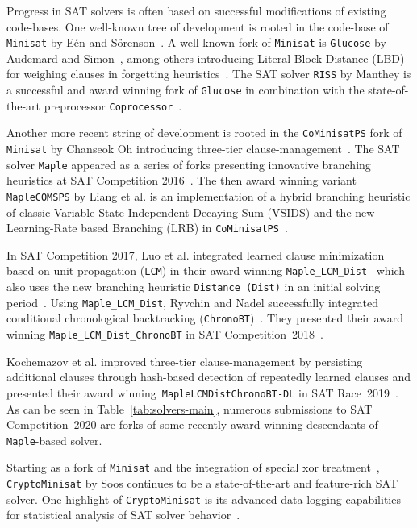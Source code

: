 \documentclass{elsarticle}
\newcommand{\solver}[1]{\texttt{#1}}
\begin{document}
Progress in SAT solvers is often based on successful modifications of existing code-bases. 
One well-known tree of development is rooted in the code-base of \solver{Minisat} by Eén and Sörenson~\cite{Niklas:2003:Minisat}. 
A well-known fork of \solver{Minisat} is \solver{Glucose} by Audemard and Simon~\cite{Audemard:2018:Glucose}, among others introducing Literal Block Distance (LBD) for weighing clauses in forgetting heuristics~\cite{Audemard:2009:Glucose}. 
The SAT solver \solver{RISS} by Manthey is a successful and award winning fork of \solver{Glucose} in combination with the state-of-the-art preprocessor \solver{Coprocessor}~\cite{Manthey:2012:Coprocessor2}. 

Another more recent string of development is rooted in the \solver{CoMinisatPS} fork of \solver{Minisat} by Chanseok Oh introducing three-tier clause-management~\cite{Oh:2015:satunsat}. 
The SAT solver \solver{Maple} appeared as a series of forks presenting innovative branching heuristics at SAT Competition 2016~\cite{Liang:2016:LRB}. 
The then award winning variant \solver{MapleCOMSPS} by Liang et al. is an implementation of a hybrid branching heuristic of classic Variable-State Independent Decaying Sum (VSIDS) and the new Learning-Rate based Branching (LRB) in \solver{CoMinisatPS}~\cite{Liang:2016:MapleCOMSPS}. 

In SAT Competition 2017, Luo et al. integrated learned clause minimization based on unit propagation (\solver{LCM}) in their award winning \solver{Maple\_LCM\_Dist}~\cite{Luo:2017:LCM} which also uses the new branching heuristic \solver{Distance (Dist)} in an initial solving period~\cite{Xiao:2017:MapleLCMDist}. 
Using \solver{Maple\_LCM\_Dist}, Ryvchin and Nadel successfully integrated conditional chronological backtracking (\solver{ChronoBT})~\cite{Nadel:2018:CBT}. 
They presented their award winning \solver{Maple\_LCM\_Dist\_ChronoBT} in SAT Competition~2018~\cite{Ryvchin:SC2018:MapleChronoBT}. 

Kochemazov et al. improved three-tier clause-management by persisting
additional clauses through hash-based detection of repeatedly learned clauses and presented their award winning~\solver{MapleLCMDistChronoBT-DL} in SAT Race~2019~\cite{Kochemazov:SC2019:MapleChronoBTDL}. 
As can be seen in Table~\ref{tab:solvers-main}, numerous submissions to SAT Competition~2020 are forks of some recently award winning descendants of \solver{Maple}-based solver. 

Starting as a fork of \solver{Minisat} and the integration of special xor treatment~\cite{Soos:2009:Crypto}, \solver{CryptoMinisat} by Soos continues to be a state-of-the-art and feature-rich SAT solver. 
One highlight of \solver{CryptoMinisat} is its advanced data-logging capabilities for statistical analysis of SAT solver behavior~\cite{Soos:2019:ChrystalBall}.
\end{document}
